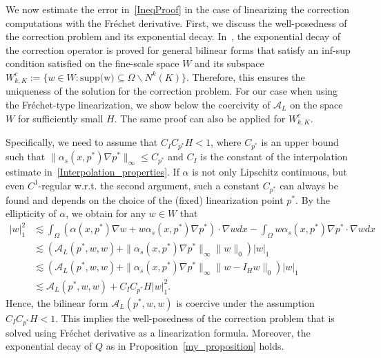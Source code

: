 \documentclass{article}
\begin{document}
We now estimate the error in~\eqref{IneqProof} in the case of linearizing the correction computations with the Fréchet derivative. First, we discuss the well-posedness of the correction problem and its exponential decay. 
In~\cite{Maier2020}, the exponential decay of the correction operator is proved for general bilinear forms that satisfy an inf-sup condition satisfied on the fine-scale space $W$ and its subspace $W^c_{k,K}:=\{w \in W: \text{supp(w)} \subseteq \Omega \backslash N^k(K)\}$. Therefore, this ensures the uniqueness of the solution for the correction problem. For our case when using the Fréchet-type linearization, we show below the coercivity of $\mathcal A_L$ on the space $W$ for sufficiently small $H$. The same proof can also be applied for $W^c_{k,K}$.
 
 
Specifically, we need to assume that $C_IC_{p^*}H<1$, where $C_{p^*}$ is an upper bound such that $\|\alpha_s(x,p^*)\nabla p^*\|_\infty \leq C_{p^*}$ and $C_I$ is the constant of the interpolation estimate in~\eqref{Interpolation_properties}. If $\alpha$ is not only Lipschitz continuous, but even $C^1$-regular w.r.t. the second argument, such a constant $C_{p^*}$ can always be found and depends on the choice of the (fixed) linearization point $p^*$. By the ellipticity of $\alpha$, we obtain for any $w\in W$ that 
\begin{align*}
    |w|_1^2 &\lesssim \int_\Omega (\alpha(x,p^*)\nabla w +w\alpha_s(x,p^*)\nabla p^*)\cdot\nabla w dx -\int_\Omega w\alpha_s(x,p^*)\nabla p^*\cdot\nabla w dx \\
    & \lesssim (\mathcal{A}_L(p^*,w,w)  + \|\alpha_s(x,p^*)\nabla p^*\|_\infty \|w\|_0)|w|_1 \\
     & \lesssim (\mathcal{A}_L(p^*,w,w)  + \|\alpha_s(x,p^*)\nabla p^*\|_\infty \|w-I_Hw\|_0)|w|_1 \\
    &\lesssim \mathcal{A}_L(p^*,w,w)  + C_IC_{p^*}H |w|_1^2.
\end{align*}
Hence, the bilinear form $\mathcal{A}_L(p^*,w,w) $ is coercive under the assumption $C_IC_{p^*}H<1$. This implies the well-posedness of the correction problem that is solved using Fréchet derivative as a linearization formula. Moreover, the exponential decay of $Q$ as in Proposition~\ref{my_proposition} holds.
\end{document}
